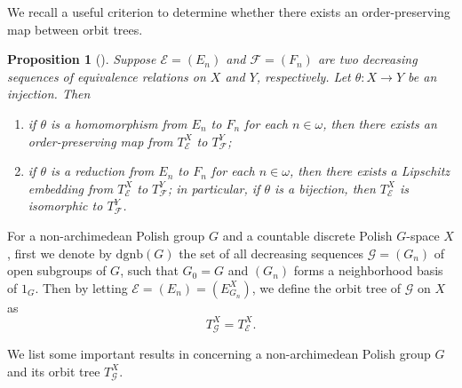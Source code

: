 \documentclass[11pt]{amsart}
\newtheorem{theorem}{Theorem}[section]
\newtheorem{proposition}[theorem]{Proposition}
\theoremstyle{definition}
\theoremstyle{remark}
\numberwithin{equation}{section}
\def\dgnb{{\mathrm{dgnb}}}
\def\otr#1#2{T_{\mathcal{#1}}^{#2}}
\begin{document}
We recall a useful criterion to determine whether there exists an order-preserving map between orbit trees.

\begin{proposition}[{\cite[Proposition 3.4]{DingW}}]\label{uniform reduction induces tree embedding}
    Suppose $\mathcal{E}=(E_n)$ and $\mathcal{F}=(F_n)$ are two decreasing sequences of equivalence relations on $X$ and $Y$, respectively. Let $\theta:X\to Y$ be an injection. Then
    \begin{enumerate}
        \item if $\theta$ is a homomorphism from $E_n$ to $F_n$ for each $n\in\omega$, then there exists an order-preserving map from $\otr{E}{X}$ to $\otr{F}{Y}$;
        \item if $\theta$ is a reduction from $E_n$ to $F_n$ for each $n\in\omega$, then there exists a Lipschitz embedding from $\otr{E}{X}$ to $\otr{F}{Y}$; in particular, if $\theta$ is a bijection, then $\otr{E}{X}$ is isomorphic to $\otr{F}{Y}$.
    \end{enumerate}
\end{proposition}

For a non-archimedean Polish group $G$ and a countable discrete Polish $G$-space $X$, first we denote by $\dgnb(G)$ the set of all decreasing sequences $\mathcal{G}=(G_n)$ of open subgroups of $G$, such that $G_0=G$ and $(G_n)$ forms a neighborhood basis of $1_G$. Then by letting $\mathcal{E}=(E_n)=(E_{G_n}^X)$, we define the orbit tree of $\mathcal{G}$ on $X$ as
$$\otr{G}{X}=\otr{E}{X}.$$


We list some important results in \cite{DingW} concerning a non-archimedean Polish group $G$ and its orbit tree $\otr{G}{X}$.
\end{document}
